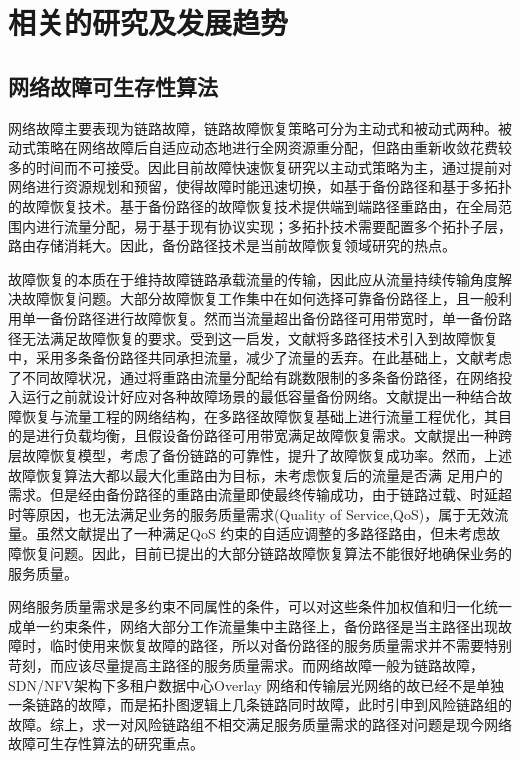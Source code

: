 \section{相关的研究及发展趋势}
\subsection{网络故障可生存性算法}
网络故障主要表现为链路故障，链路故障恢复策略可分为主动式和被动式两种\cite{kvalbein2006fast,qi2012research}。被动式策略在网络故障后自适应动态地进行全网资源重分配，但路由重新收敛花费较多的时间而不可接受。因此目前故障快速恢复研究以主动式策略为主，通过提前对网络进行资源规划和预留，使得故障时能迅速切换，如基于备份路径和基于多拓扑\cite{shand2010ip}的故障恢复技术。基于备份路径的故障恢复技术提供端到端路径重路由，在全局范围内进行流量分配，易于基于现有协议实现；多拓扑技术需要配置多个拓扑子层，路由存储消耗大。因此，备份路径技术是当前故障恢复领域研究的热点\cite{yang2014keep,wang2010r3,banner2010designing,suchara2011network,zheng2014cross}。

故障恢复的本质在于维持故障链路承载流量的传输，因此应从流量持续传输角度解决故障恢复问题。大部分故障恢复工作集中在如何选择可靠备份路径上，且一般利用单一备份路径进行故障恢复。然而当流量超出备份路径可用带宽时，单一备份路径无法满足故障恢复的要求。受到这一启发，文献\cite{wang2010r3}将多路径技术引入到故障恢复中，采用多条备份路径共同承担流量，减少了流量的丢弃。在此基础上，文献\cite{banner2010designing}考虑了不同故障状况，通过将重路由流量分配给有跳数限制的多条备份路径，在网络投入运行之前就设计好应对各种故障场景的最低容量备份网络。文献\cite{suchara2011network}提出一种结合故障恢复与流量工程的网络结构，在多路径故障恢复基础上进行流量工程优化，其目的是进行负载均衡，且假设备份路径可用带宽满足故障恢复需求。文献\cite{zheng2014cross}提出一种跨层故障恢复模型，考虑了备份链路的可靠性，提升了故障恢复成功率。然而，上述故障恢复算法大都以最大化重路由为目标，未考虑恢复后的流量是否满
足用户的需求。但是经由备份路径的重路由流量即使最终传输成功，由于链路过载、时延超时等原因，也无法满足业务的服务质量需求(Quality of Service,QoS)，属于无效流量。虽然文献\cite{misra2009polynomial}提出了一种满足QoS 约束的自适应调整的多路径路由，但未考虑故障恢复问题。因此，目前已提出的大部分链路故障恢复算法不能很好地确保业务的服务质量。

网络服务质量需求是多约束不同属性的条件，可以对这些条件加权值和归一化统一成单一约束条件，网络大部分工作流量集中主路径上，备份路径是当主路径出现故障时，临时使用来恢复故障的路径，所以对备份路径的服务质量需求并不需要特别苛刻，而应该尽量提高主路径的服务质量需求。而网络故障一般为链路故障，SDN/NFV架构下多租户数据中心Overlay 网络和传输层光网络的故已经不是单独一条链路的故障，而是拓扑图逻辑上几条链路同时故障，此时引申到风险链路组的故障。综上，求一对风险链路组不相交满足服务质量需求的路径对问题是现今网络故障可生存性算法的研究重点。



